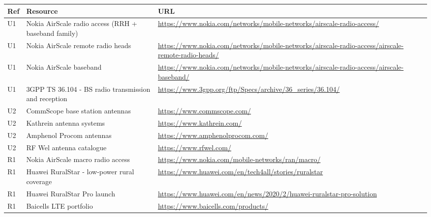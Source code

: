 \documentclass[9pt,a4paper]{extarticle}
\newcommand{\ulinkurl}[1]{#1}
\begin{document}
{\scriptsize
\begin{longtable}{@{}p{0.65cm}p{4.4cm}p{9.7cm}@{}}
\toprule
\textbf{Ref} & \textbf{Resource} & \textbf{URL} \\
\midrule
\endhead
U1 & Nokia AirScale radio access (RRH + baseband family) & \href{https://www.nokia.com/networks/mobile-networks/airscale-radio-access/}{\ulinkurl{https://www.nokia.com/networks/mobile-networks/airscale-radio-access/}} \\
U1 & Nokia AirScale remote radio heads & \href{https://www.nokia.com/networks/mobile-networks/airscale-radio-access/airscale-remote-radio-heads/}{\ulinkurl{https://www.nokia.com/networks/mobile-networks/airscale-radio-access/airscale-remote-radio-heads/}} \\
U1 & Nokia AirScale baseband & \href{https://www.nokia.com/networks/mobile-networks/airscale-radio-access/airscale-baseband/}{\ulinkurl{https://www.nokia.com/networks/mobile-networks/airscale-radio-access/airscale-baseband/}} \\
U1 & 3GPP TS 36.104 - BS radio transmission and reception & \href{https://www.3gpp.org/ftp/Specs/archive/36_series/36.104/}{\ulinkurl{https://www.3gpp.org/ftp/Specs/archive/36\_series/36.104/}} \\
U2 & CommScope base station antennas & \href{https://www.commscope.com/}{\ulinkurl{https://www.commscope.com/}} \\
U2 & Kathrein antenna systems & \href{https://www.kathrein.com/}{\ulinkurl{https://www.kathrein.com/}} \\
U2 & Amphenol Procom antennas & \href{https://www.amphenolprocom.com/}{\ulinkurl{https://www.amphenolprocom.com/}} \\
U2 & RF Wel antenna catalogue & \href{https://www.rfwel.com/}{\ulinkurl{https://www.rfwel.com/}} \\
R1 & Nokia AirScale macro radio access & \href{https://www.nokia.com/mobile-networks/ran/macro/}{\ulinkurl{https://www.nokia.com/mobile-networks/ran/macro/}} \\
R1 & Huawei RuralStar - low-power rural coverage & \href{https://www.huawei.com/en/tech4all/stories/ruralstar}{\ulinkurl{https://www.huawei.com/en/tech4all/stories/ruralstar}} \\
R1 & Huawei RuralStar Pro launch & \href{https://www.huawei.com/en/news/2020/2/huawei-ruralstar-pro-solution}{\ulinkurl{https://www.huawei.com/en/news/2020/2/huawei-ruralstar-pro-solution}} \\
R1 & Baicells LTE portfolio & \href{https://www.baicells.com/products/}{\ulinkurl{https://www.baicells.com/products/}} \\

\end{longtable}}
\end{document}
